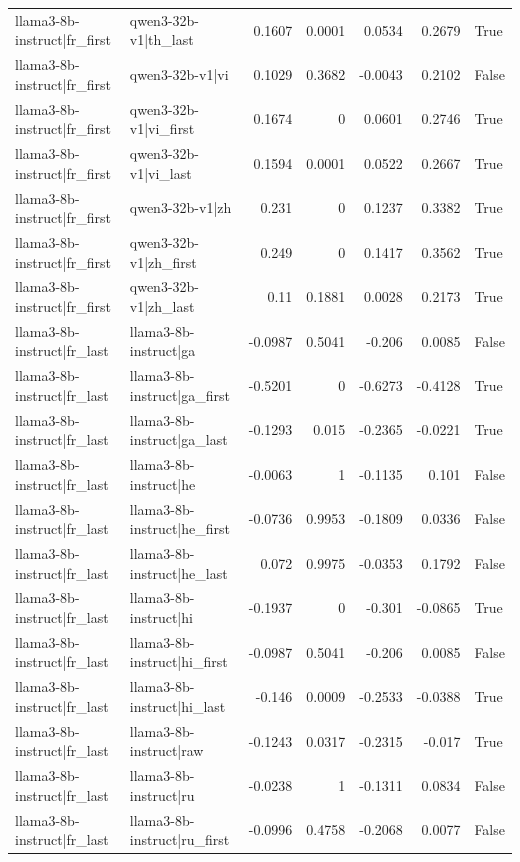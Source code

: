 \begin{table}
\begin{tabular}{l l r r r r l}
llama3-8b-instruct|fr_first & qwen3-32b-v1|th_last & 0.1607 & 0.0001 & 0.0534 & 0.2679 & True \\
llama3-8b-instruct|fr_first & qwen3-32b-v1|vi & 0.1029 & 0.3682 & -0.0043 & 0.2102 & False \\
llama3-8b-instruct|fr_first & qwen3-32b-v1|vi_first & 0.1674 & 0 & 0.0601 & 0.2746 & True \\
llama3-8b-instruct|fr_first & qwen3-32b-v1|vi_last & 0.1594 & 0.0001 & 0.0522 & 0.2667 & True \\
llama3-8b-instruct|fr_first & qwen3-32b-v1|zh & 0.231 & 0 & 0.1237 & 0.3382 & True \\
llama3-8b-instruct|fr_first & qwen3-32b-v1|zh_first & 0.249 & 0 & 0.1417 & 0.3562 & True \\
llama3-8b-instruct|fr_first & qwen3-32b-v1|zh_last & 0.11 & 0.1881 & 0.0028 & 0.2173 & True \\
llama3-8b-instruct|fr_last & llama3-8b-instruct|ga & -0.0987 & 0.5041 & -0.206 & 0.0085 & False \\
llama3-8b-instruct|fr_last & llama3-8b-instruct|ga_first & -0.5201 & 0 & -0.6273 & -0.4128 & True \\
llama3-8b-instruct|fr_last & llama3-8b-instruct|ga_last & -0.1293 & 0.015 & -0.2365 & -0.0221 & True \\
llama3-8b-instruct|fr_last & llama3-8b-instruct|he & -0.0063 & 1 & -0.1135 & 0.101 & False \\
llama3-8b-instruct|fr_last & llama3-8b-instruct|he_first & -0.0736 & 0.9953 & -0.1809 & 0.0336 & False \\
llama3-8b-instruct|fr_last & llama3-8b-instruct|he_last & 0.072 & 0.9975 & -0.0353 & 0.1792 & False \\
llama3-8b-instruct|fr_last & llama3-8b-instruct|hi & -0.1937 & 0 & -0.301 & -0.0865 & True \\
llama3-8b-instruct|fr_last & llama3-8b-instruct|hi_first & -0.0987 & 0.5041 & -0.206 & 0.0085 & False \\
llama3-8b-instruct|fr_last & llama3-8b-instruct|hi_last & -0.146 & 0.0009 & -0.2533 & -0.0388 & True \\
llama3-8b-instruct|fr_last & llama3-8b-instruct|raw & -0.1243 & 0.0317 & -0.2315 & -0.017 & True \\
llama3-8b-instruct|fr_last & llama3-8b-instruct|ru & -0.0238 & 1 & -0.1311 & 0.0834 & False \\
llama3-8b-instruct|fr_last & llama3-8b-instruct|ru_first & -0.0996 & 0.4758 & -0.2068 & 0.0077 & False \\

\end{tabular}
\end{table}
